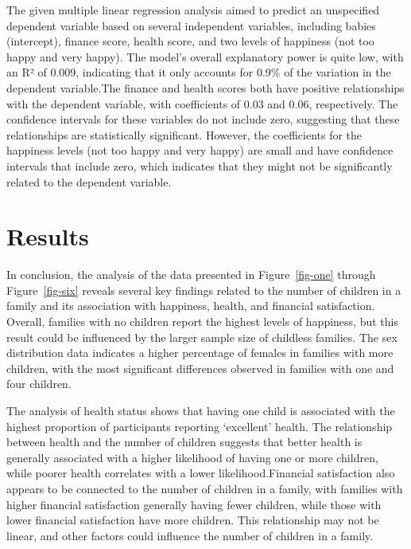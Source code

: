 \documentclass[
  letterpaper,
  DIV=11,
  numbers=noendperiod]{scrartcl}
\begin{document}
The given multiple linear regression analysis aimed to predict an
unspecified dependent variable based on several independent variables,
including babies (intercept), finance score, health score, and two
levels of happiness (not too happy and very happy). The model's overall
explanatory power is quite low, with an R² of 0.009, indicating that it
only accounts for 0.9\% of the variation in the dependent variable.The
finance and health scores both have positive relationships with the
dependent variable, with coefficients of 0.03 and 0.06, respectively.
The confidence intervals for these variables do not include zero,
suggesting that these relationships are statistically significant.
However, the coefficients for the happiness levels (not too happy and
very happy) are small and have confidence intervals that include zero,
which indicates that they might not be significantly related to the
dependent variable.

\hypertarget{results}{%
\section{Results}\label{results}}

In conclusion, the analysis of the data presented in
Figure~\ref{fig-one} through Figure~\ref{fig-six} reveals several key
findings related to the number of children in a family and its
association with happiness, health, and financial satisfaction. Overall,
families with no children report the highest levels of happiness, but
this result could be influenced by the larger sample size of childless
families. The sex distribution data indicates a higher percentage of
females in families with more children, with the most significant
differences observed in families with one and four children.

The analysis of health status shows that having one child is associated
with the highest proportion of participants reporting `excellent'
health. The relationship between health and the number of children
suggests that better health is generally associated with a higher
likelihood of having one or more children, while poorer health
correlates with a lower likelihood.Financial satisfaction also appears
to be connected to the number of children in a family, with families
with higher financial satisfaction generally having fewer children,
while those with lower financial satisfaction have more children. This
relationship may not be linear, and other factors could influence the
number of children in a family.
\end{document}

